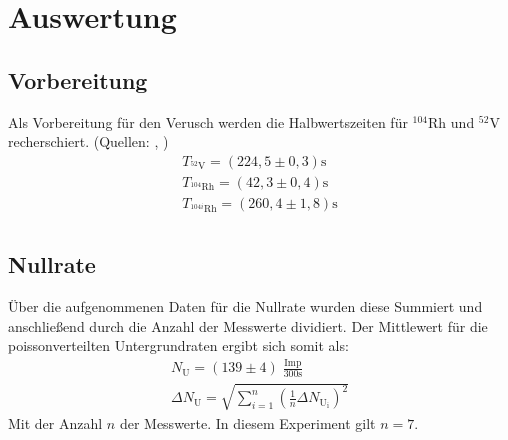\section{Auswertung}
\subsection{Vorbereitung}
Als Vorbereitung für den Verusch werden die Halbwertszeiten für $^{104}$Rh und $^{52}$V recherschiert. (Quellen: \cite{V} , \cite{Rh})
\begin{align}
    T_{^{52}\text{V}} = (224,5 \pm 0,3) \text{s}\\
    T_{^{104}\text{Rh}} = (42,3 \pm 0,4) \text{s}\\
    T_{^{104i}\text{Rh}} = (260,4 \pm 1,8) \text{s}\\
\end{align}
\subsection{Nullrate}
Über die aufgenommenen Daten für die Nullrate wurden diese Summiert und anschließend durch die Anzahl der Messwerte dividiert.
Der Mittlewert für die poissonverteilten Untergrundraten ergibt sich somit als:
\begin{align}
    N_{\text{U}} =  (139\pm 4) \; \frac{\text{Imp}}{300 \text{s}} \\
    \Delta N_{\text{U}} = \sqrt{ \sum_{i=1}^n \left( \frac{1}{n}\Delta N_{\text{U}_{\text{i}}} \right)^2}
\end{align}
Mit der Anzahl $n$ der Messwerte. In diesem Experiment gilt $n = 7$.
